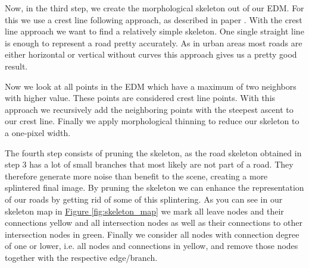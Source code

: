 \documentclass[10pt,conference,compsocconf]{IEEEtran}
\newcommand{\figref}[1]{\hyperref[#1]{Figure \ref*{#1}}}
\begin{document}
Now, in the third step, we create the morphological skeleton out of our EDM. For this we use a crest line following approach, as described in paper \cite{GaZeScPo11}. With the crest line approach we want to find a relatively simple skeleton. One single straight line is enough to represent a road pretty accurately. As in urban areas most roads are either horizontal or vertical without curves this approach gives us a pretty good result. 

Now we look at all points in the EDM which have a maximum of two neighbors with higher value. These points are considered crest line points. With this approach we recursively add the neighboring points with the steepest ascent to our crest line. Finally we apply morphological thinning to reduce our skeleton to a one-pixel width.

The fourth step consists of pruning the skeleton, as the road skeleton obtained in step 3 has a lot of small branches that most likely are not part of a road. They therefore generate more noise than benefit to the scene, creating a more splintered final image. By pruning the skeleton we can enhance the representation of our roads by getting rid of some of this splintering. As you can see in our skeleton map in \figref{fig:skeleton_map} we mark all leave nodes and their connections yellow and all intersection nodes as well as their connections to other intersection nodes in green. Finally we consider all nodes with connection degree of one or lower, i.e. all nodes and connections in yellow, and remove those nodes together with the respective edge/branch.
\end{document}
